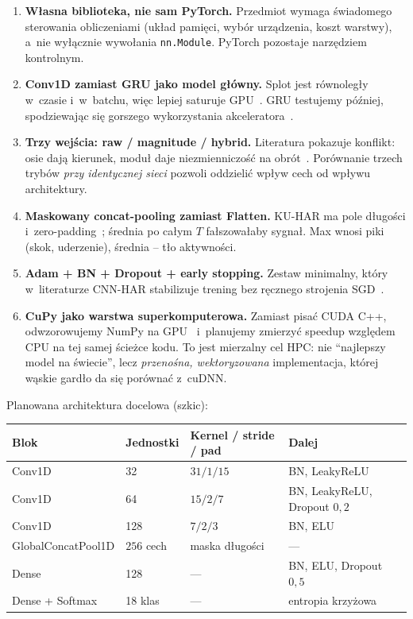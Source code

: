 \documentclass[12pt,a4paper]{article}
\begin{document}
\begin{enumerate}[leftmargin=1.4em, itemsep=0.4em]
  \item \textbf{Własna biblioteka, nie sam PyTorch.}
  Przedmiot wymaga świadomego sterowania obliczeniami (układ pamięci, wybór urządzenia, koszt warstwy), a~nie wyłącznie wywołania \texttt{nn.Module}. PyTorch pozostaje narzędziem kontrolnym.

  \item \textbf{Conv1D zamiast GRU jako model główny.}
  Splot jest równoległy w~czasie i~w~batchu, więc lepiej saturuje GPU~\cite{yang2015cnn,harris2007gpu}. GRU testujemy później, spodziewając się gorszego wykorzystania akceleratora~\cite{hammerla2016deep}.

  \item \textbf{Trzy wejścia: raw / magnitude / hybrid.}
  Literatura pokazuje konflikt: osie dają kierunek, moduł daje niezmienniczość na obrót~\cite{figo2010preprocessing,yurtman2017orientation}. Porównanie trzech trybów \emph{przy identycznej sieci} pozwoli oddzielić wpływ cech od wpływu architektury.

  \item \textbf{Maskowany concat-pooling zamiast Flatten.}
  KU-HAR ma pole długości i~zero-padding~\cite{sikder2021kuhar}; średnia po całym $T$ fałszowałaby sygnał. Max wnosi piki (skok, uderzenie), średnia -- tło aktywności.

  \item \textbf{Adam + BN + Dropout + early stopping.}
  Zestaw minimalny, który w~literaturze CNN-HAR stabilizuje trening bez ręcznego strojenia SGD~\cite{ioffe2015bn,kingma2015adam,ronao2016cnn}.

  \item \textbf{CuPy jako warstwa superkomputerowa.}
  Zamiast pisać CUDA C++, odwzorowujemy NumPy na GPU~\cite{okuta2017cupy} i~planujemy zmierzyć speedup względem CPU na tej samej ścieżce kodu. To jest mierzalny cel HPC: nie ``najlepszy model na świecie'', lecz \emph{przenośna, wektoryzowana} implementacja, której wąskie gardło da się porównać z~cuDNN.
\end{enumerate}

Planowana architektura docelowa (szkic):
\begin{center}
\small
\begin{tabular}{@{}llll@{}}
\toprule
Blok & Jednostki & Kernel / stride / pad & Dalej \\
\midrule
Conv1D & 32  & $31/1/15$ & BN, LeakyReLU \\
Conv1D & 64  & $15/2/7$  & BN, LeakyReLU, Dropout $0{,}2$ \\
Conv1D & 128 & $7/2/3$   & BN, ELU \\
GlobalConcatPool1D & $256$ cech & maska długości & --- \\
Dense & 128 & --- & BN, ELU, Dropout $0{,}5$ \\
Dense + Softmax & 18 klas & --- & entropia krzyżowa \\
\bottomrule
\end{tabular}
\end{center}
\end{document}
